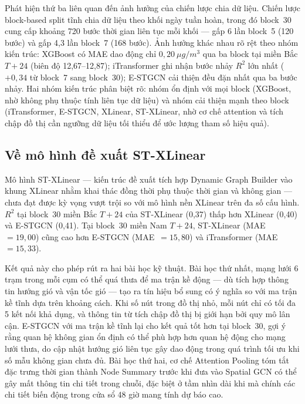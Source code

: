 Phát hiện thứ ba liên quan đến ảnh hưởng của chiến lược chia dữ liệu. Chiến lược block-based split tĩnh chia dữ liệu theo khối ngày tuần hoàn, trong đó block~30 cung cấp khoảng 720 bước thời gian liên tục mỗi khối --- gấp 6 lần block~5 (120 bước) và gấp 4,3 lần block~7 (168 bước). Ảnh hưởng khác nhau rõ rệt theo nhóm kiến trúc: XGBoost có MAE dao động chỉ $0{,}20~\mu g/m^3$ qua ba block tại miền Bắc $T{+}24$ (biên độ 12,67--12,87); iTransformer ghi nhận bước nhảy $R^2$ lớn nhất ($+0{,}34$ từ block~7 sang block~30); E-STGCN cải thiện đều đặn nhất qua ba bước nhảy. Hai nhóm kiến trúc phân biệt rõ: nhóm ổn định với mọi block (XGBoost, nhờ không phụ thuộc tính liên tục dữ liệu) và nhóm cải thiện mạnh theo block (iTransformer, E-STGCN, XLinear, ST-XLinear, nhờ cơ chế attention và tích chập đồ thị cần ngưỡng dữ liệu tối thiểu để ước lượng tham số hiệu quả).

\subsection{Về mô hình đề xuất ST-XLinear}

Mô hình ST-XLinear --- kiến trúc đề xuất tích hợp Dynamic Graph Builder vào khung XLinear nhằm khai thác đồng thời phụ thuộc thời gian và không gian --- chưa đạt được kỳ vọng vượt trội so với mô hình nền XLinear trên đa số cấu hình. $R^2$ tại block~30 miền Bắc $T{+}24$ của ST-XLinear (0,37) thấp hơn XLinear (0,40) và E-STGCN (0,41). Tại block~30 miền Nam $T{+}24$, ST-XLinear (MAE~$= 19{,}00$) cũng cao hơn E-STGCN (MAE~$= 15{,}80$) và iTransformer (MAE~$= 15{,}33$).

Kết quả này cho phép rút ra hai bài học kỹ thuật. Bài học thứ nhất, mạng lưới 6 trạm trong mỗi cụm có thể quá thưa để ma trận kề động --- dù tích hợp thông tin hướng gió và vận tốc gió --- tạo ra tín hiệu bổ sung có ý nghĩa so với ma trận kề tĩnh dựa trên khoảng cách. Khi số nút trong đồ thị nhỏ, mỗi nút chỉ có tối đa 5 kết nối khả dụng, và thông tin từ tích chập đồ thị bị giới hạn bởi quy mô lân cận. E-STGCN với ma trận kề tĩnh lại cho kết quả tốt hơn tại block~30, gợi ý rằng quan hệ không gian ổn định có thể phù hợp hơn quan hệ động cho mạng lưới thưa, do cập nhật hướng gió liên tục gây dao động trong quá trình tối ưu khi số mẫu không gian chưa đủ. Bài học thứ hai, cơ chế Attention Pooling tóm tắt đặc trưng thời gian thành Node Summary trước khi đưa vào Spatial GCN có thể gây mất thông tin chi tiết trong chuỗi, đặc biệt ở tầm nhìn dài khi mà chính các chi tiết biến động trong cửa sổ 48 giờ mang tính dự báo cao.

